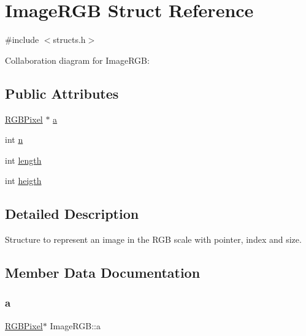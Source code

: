 \hypertarget{structImageRGB}{}\section{Image\+R\+GB Struct Reference}
\label{structImageRGB}


{\ttfamily \#include $<$structs.\+h$>$}



Collaboration diagram for Image\+R\+GB\+:
\subsection*{Public Attributes}
\begin{DoxyCompactItemize}
\item 
\hyperlink{structRGBPixel}{R\+G\+B\+Pixel} $\ast$ \hyperlink{structImageRGB_a03634ad05861e7963ee121e90801b4c2}{a}
\item 
int \hyperlink{structImageRGB_a2f1abb0dcc200c479eff40638e30da79}{n}
\item 
int \hyperlink{structImageRGB_aade093b3345da900be6b0b572e1a2ff3}{length}
\item 
int \hyperlink{structImageRGB_aa1dbfe9fed4d3988825125b84aae6bfd}{heigth}
\end{DoxyCompactItemize}


\subsection{Detailed Description}
Structure to represent an image in the R\+GB scale with pointer, index and size. 

\subsection{Member Data Documentation}
\mbox{\label{structImageRGB_a03634ad05861e7963ee121e90801b4c2}} 
\subsubsection{\texorpdfstring{a}{a}}
{\footnotesize\ttfamily \hyperlink{structRGBPixel}{R\+G\+B\+Pixel}$\ast$ Image\+R\+G\+B\+::a}

\mbox{\label{structImageRGB_aa1dbfe9fed4d3988825125b84aae6bfd}} 
